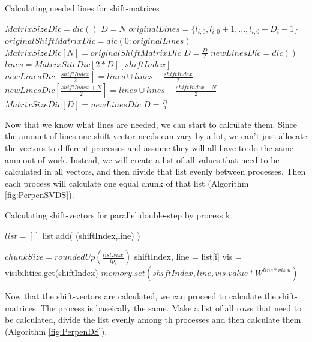 \documentclass[12pt]{article}
\begin{document}
\begin{algorithm}
\caption{Calculating needed lines for shift-matrices}\label{euclid}
\label{fig:RecusriveLines}
\begin{algorithmic}[1]
\State $MatrixSizeDic = dic()$
\State $D = N$
\State $originalLines = \{l_{i,0},l_{i,0}+1,...,l_{i,0}+D_i-1\}$
\State $originalShiftMatrixDic = dic( 0: originalLines )$
\State $MatrixSizeDic[N] = originalShiftMatrixDic$
\State $D = \frac{D}{2}$
        \State $newLinesDic = dic()$
             \State $lines = MatrixSiteDic[2*D][shiftIndex]$
             \State $newLinesDic[\frac{shiftIndex}{2}] = lines \cup lines+\frac{shiftIndex}{2}$
             \State $newLinesDic[\frac{shiftIndex+N}{2}]= lines \cup lines+\frac{shiftIndex+N}{2}$
        \EndFor
        \State $MatrixSizeDic[D] = newLinesDic$
        \State $D = \frac{D}{2}$
\EndWhile
\end{algorithmic}
\end{algorithm}

Now that we know what lines are needed, we can start to calculate them. Since the amount of lines one shift-vector needs can vary by a lot, we can't just allocate the vectors to different processes and assume they will all have to do the same ammout  of work. Instead, we will create a list of all values that need to be calculated in all vectors, and then divide that list evenly between processes. Then each process will calculate one equal chunk of that list (Algorithm \ref{fig:PerpenSVDS}).\\

\begin{algorithm}
\caption{Calculating shift-vectors for parallel double-step by process k}\label{euclid}
\label{fig:PerpenSVDS}
\begin{algorithmic}[1]
\State $list = []$
          list.add( (shiftIndex,line) )
     \EndFor
\EndFor

\State $chunkSize = roundedUp( \frac{list.size}{lp_i} )$
     \State shiftIndex, line = list[i]
     \State vis = visibilities.get(shiftIndex)
     \State $memory.set( shiftIndex, line, vis.value*W^{line*vis.u} )$
\EndFor
\end{algorithmic}
\end{algorithm}

Now that the shift-vectors are calculated, we can proceed to calculate the shift-matrices. The process is baseically the same. Make a list of all rows that need to be calculated, divide the list evenly among th processes and then calculate them (Algorithm \ref{fig:PerpenDS}).
\end{document}
